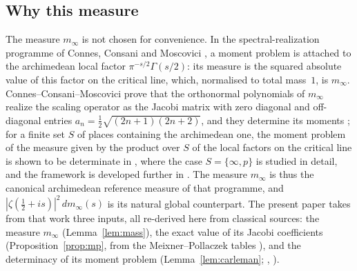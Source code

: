 \documentclass[11pt]{amsart}
\theoremstyle{definition}
\theoremstyle{remark}
\newcommand{\minf}{m_\infty}
\begin{document}
\subsection{Why this measure}
The measure $\minf$ is not chosen for convenience. In the
spectral-realization programme of Connes, Consani and Moscovici
\cite{CCMprolate,CCMq,CCMtriples}, a moment problem is attached to the
archimedean local factor $\pi^{-s/2}\Gamma(s/2)$: its measure is the squared
absolute value of this factor on the critical line, which, normalised to total mass~$1$, is $\minf$.
Connes--Consani--Moscovici prove \cite[Prop.~3.3 and Thm.~5.2]{CCMprolate} that the orthonormal polynomials of $\minf$
realize the scaling operator as the Jacobi matrix with zero diagonal and
off-diagonal entries $a_n=\tfrac12\sqrt{(2n+1)(2n+2)}$, and they determine
its moments \cite[Prop.~5.2]{CCMprolate}; for a finite set $S$ of places
containing the archimedean one, the moment problem of the measure given by
the product over $S$ of the local factors on the critical line is shown to
be determinate in \cite[Prop.~3.1]{CCMq}, where the case $S=\{\infty,p\}$ is
studied in detail, and the
framework is developed further in \cite{CCMtriples}. The measure $\minf$ is
thus the canonical archimedean reference measure of that programme, and
$|\zeta(\tfrac12+is)|^{2}\,d\minf(s)$ is its natural global counterpart. The
present paper takes from that work three inputs, all re-derived here from
classical sources: the measure $\minf$ (Lemma~\ref{lem:mass}), the exact
value of its Jacobi coefficients (Proposition~\ref{prop:mp}, from the
Meixner--Pollaczek tables \cite{KLS}), and the determinacy of its moment
problem (Lemma~\ref{lem:carleman}; \cite[Thm.~5.2]{CCMprolate},
\cite[Prop.~3.1]{CCMq}).
\end{document}

